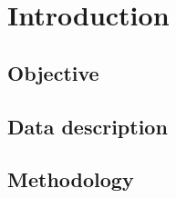 \section{Introduction}

\subsection{Objective}

\subsection{Data description}

\subsection{Methodology}